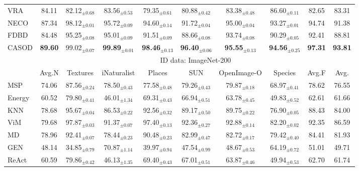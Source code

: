 \begin{table}[t!]
{\begin{tabular}{|l|c|cccccc|c|c|}
VRA\cite{xu2024vra}    & 84.11 & 82.12$_{\pm 0.68}$ & 83.56$_{\pm 0.53}$ & 79.35$_{\pm 0.61}$ & 80.88$_{\pm 0.42}$ & 83.38$_{\pm 0.48}$ & 86.60$_{\pm 0.11}$ & 82.65 & 83.31 \\
NECO\cite{ammar2024neco}   &  87.34 & 98.12$_{\pm 0.01}$ & 95.72$_{\pm 0.09}$ & 94.60$_{\pm 0.14}$ & 91.72$_{\pm 0.04}$ & 95.00$_{\pm 0.04}$ & 93.27$_{\pm 0.01}$ & 94.74 & 91.38 \\
FDBD\cite{liu2024fast}   &  84.48 & 95.25$_{\pm 0.08}$ & 95.01$_{\pm 0.09}$ & 91.51$_{\pm 0.09}$ & 88.66$_{\pm 0.08}$ & 93.74$_{\pm 0.08}$ & 90.29$_{\pm 0.05}$ & 92.41 & 88.81 \\ \hline
CASOD  & \textbf{89.60} & 99.02$_{\pm 0.07}$ & \textbf{99.89}$_{\pm 0.01}$ & \textbf{98.46}$_{\pm 0.13}$ & \textbf{96.40}$_{\pm 0.06}$ & \textbf{95.55}$_{\pm 0.13}$ & \textbf{94.56}$_{\pm 0.25}$ & \textbf{97.31} & \textbf{93.81} \\ \hline
			\multirow{2}{*}{} &  \multicolumn{9}{c|}{ID data: ImageNet-200}  \\ \cline{2-10}
			& Avg.N & Textures  & iNaturalist  & Places  & SUN & OpenImage-O & Species & Avg.F & Avg. \\ \hline
            MSP\cite{hendrycks2017baseline}    & 74.06 & 87.56$_{\pm 0.24}$ & 78.50$_{\pm 0.43}$ & 77.58$_{\pm 0.48}$ & 79.26$_{\pm 0.43}$ & 79.87$_{\pm 0.18}$ & 68.97$_{\pm 0.41}$ & 78.62 & 76.55 \\
Energy\cite{liu2020energy} &  60.52 & 79.80$_{\pm 0.41}$ & 46.01$_{\pm 1.34}$ & 69.31$_{\pm 0.43}$ & 66.94$_{\pm 0.51}$ & 63.78$_{\pm 0.45}$ & 49.83$_{\pm 0.52}$ & 62.61 & 61.66 \\
KNN\cite{sun2022out}    &  78.68 & 95.67$_{\pm 0.04}$ & 86.53$_{\pm 0.22}$ & 92.56$_{\pm 0.32}$ & 89.17$_{\pm 0.50}$ & 89.75$_{\pm 0.22}$ & 76.90$_{\pm 0.05}$ & 88.43 & 84.00 \\
ViM\cite{wang2022vim}    &  79.68 & 97.87$_{\pm 0.03}$ & 91.37$_{\pm 0.07}$ & 97.40$_{\pm 0.13}$ & 92.36$_{\pm 0.27}$ & 92.88$_{\pm 0.14}$ & 82.20$_{\pm 0.02}$ & 92.35 & 86.59 \\
MD\cite{lee2018simple}     &  78.96 & 92.41$_{\pm 0.07}$ & 78.44$_{\pm 0.23}$ & 90.48$_{\pm 0.23}$ & 82.99$_{\pm 0.47}$ & 82.72$_{\pm 0.17}$ & 79.42$_{\pm 0.40}$ & 84.41 & 81.93 \\
GEN\cite{liu2023gen}    &  48.14 & 34.85$_{\pm 0.79}$ & 70.87$_{\pm 1.14}$ & 39.97$_{\pm 0.94}$ & 47.54$_{\pm 0.99}$ & 48.67$_{\pm 0.53}$ & 64.19$_{\pm 0.72}$ & 51.01 & 49.71 \\
ReAct\cite{sun2021react}  &  60.59 & 79.86$_{\pm 0.42}$ & 46.13$_{\pm 1.35}$ & 69.40$_{\pm 0.43}$ & 67.01$_{\pm 0.51}$ & 63.87$_{\pm 0.46}$ & 49.94$_{\pm 0.53}$ & 62.70 & 61.74 \\

\end{tabular}}
\end{table}
